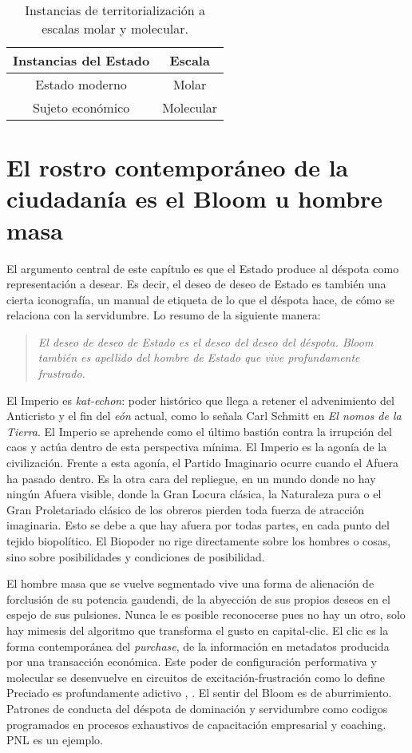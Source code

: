 \begin{table}[htb]
  \caption{Instancias de territorialización a escalas molar y molecular.}
  \label{tab:tablename}
  \centering
  \begin{tabular}{cc}
    \toprule
    \textbf{Instancias del Estado} & \textbf{Escala}\tabularnewline
    \midrule
    Estado moderno & Molar\tabularnewline
    Sujeto económico & Molecular\tabularnewline
    \bottomrule
  \end{tabular}
\end{table}

\section{El rostro contemporáneo de la ciudadanía es el Bloom u hombre masa}
\label{sec:el-rostro-contemporáneo}

El argumento central de este capítulo es que el Estado produce al déspota como representación a desear. Es decir, el deseo de deseo de Estado es también una cierta iconografía, un manual de etiqueta de lo que el déspota hace, de cómo se relaciona con la servidumbre. Lo resumo de la siguiente manera:

\begin{quote}
  \emph{El deseo de deseo de Estado es el deseo del deseo del déspota. Bloom también es apellido del hombre de Estado que vive profundamente frustrado.}
\end{quote}

El Imperio es \emph{kat-echon}: poder histórico que llega a retener el advenimiento del Anticristo y el fin del \emph{eón} actual, como lo señala Carl Schmitt en \emph{El nomos de la Tierra}. El Imperio se aprehende como el último bastión contra la irrupción del caos y actúa dentro de esta perspectiva mínima. El Imperio es la agonía de la civilización. Frente a esta agonía, el Partido Imaginario ocurre cuando el Afuera ha pasado dentro. Es la otra cara del repliegue, en un mundo donde no hay ningún Afuera visible, donde la Gran Locura clásica, la Naturaleza pura o el Gran Proletariado clásico de los obreros pierden toda fuerza de atracción imaginaria. Esto se debe a que hay afuera por todas partes, en cada punto del tejido biopolítico. El Biopoder no rige directamente sobre los hombres o cosas, sino sobre posibilidades y condiciones de posibilidad.

El hombre masa que se vuelve segmentado vive una forma de alienación de forclusión de su potencia gaudendi, de la abyección de sus propios deseos en el espejo de sus pulsiones. Nunca le es posible reconocerse pues no hay un otro, solo hay mimesis del algoritmo que transforma el gusto en capital-clic. El clic es la forma contemporánea del \emph{purchase}, de la información en metadatos producida por una transacción económica. Este poder de configuración performativa y molecular se desenvuelve en circuitos de excitación-frustración como lo define Preciado es profundamente adictivo \autocite{preciadoTestoYonqui2008}, \autocite{anderssonSocialMediaDeliberately2018}. El sentir del Bloom es de aburrimiento. Patrones de conducta del déspota de dominación y servidumbre como codigos programados en procesos exhaustivos de capacitación empresarial y coaching. PNL es un ejemplo.

